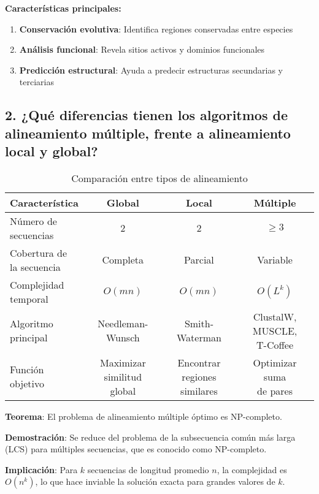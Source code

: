 \documentclass[fleqn,10pt]{article}
\begin{document}
\textbf{Características principales:}
\begin{enumerate}[label=\textbf{\alph*)}]
    \item \textbf{Conservación evolutiva}: Identifica regiones conservadas entre especies
    \item \textbf{Análisis funcional}: Revela sitios activos y dominios funcionales
    \item \textbf{Predicción estructural}: Ayuda a predecir estructuras secundarias y terciarias
\end{enumerate}

\subsection{2. ¿Qué diferencias tienen los algoritmos de alineamiento múltiple, frente a alineamiento local y global?}

\begin{table}[htbp]
\centering
\caption{Comparación entre tipos de alineamiento}
\begin{tabular}{@{}lccc@{}}
\toprule
\textbf{Característica} & \textbf{Global} & \textbf{Local} & \textbf{Múltiple} \\
\midrule
\makecell{Número de \\ secuencias} & 2 & 2 & $\geq 3$ \\
\makecell{Cobertura de \\ la secuencia} & Completa & Parcial & Variable \\
\makecell{Complejidad \\ temporal} & $O(mn)$ & $O(mn)$ & $O(L^k)$ \\
\makecell{Algoritmo \\ principal} & \makecell{Needleman-\\Wunsch} & \makecell{Smith-\\Waterman} & \makecell{ClustalW, MUSCLE,\\T-Coffee} \\
\makecell{Función \\ objetivo} & \makecell{Maximizar similitud\\global} & \makecell{Encontrar regiones\\similares} & \makecell{Optimizar suma\\de pares} \\
\bottomrule
\end{tabular}
\end{table}

\begin{tcolorbox}[breakable, colback=green!5!white,colframe=green!75!black,title=Teorema de Complejidad]
\textbf{Teorema}: El problema de alineamiento múltiple óptimo es NP-completo.

\textbf{Demostración}: Se reduce del problema de la subsecuencia común más larga (LCS) para múltiples secuencias, que es conocido como NP-completo.

\textbf{Implicación}: Para $k$ secuencias de longitud promedio $n$, la complejidad es $O(n^k)$, lo que hace inviable la solución exacta para grandes valores de $k$.
\end{tcolorbox}
\end{document}
